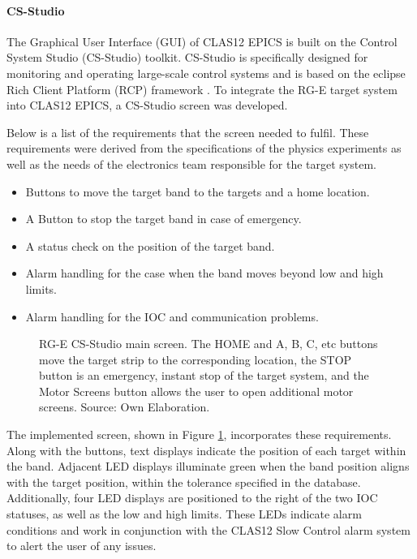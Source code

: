 \paragraph{CS-Studio}
\label{par::cs_studio}
    The Graphical User Interface (GUI) of CLAS12 EPICS is built on the Control System Studio (CS-Studio) toolkit.
    CS-Studio is specifically designed for monitoring and operating large-scale control systems and is based on the eclipse Rich Client Platform (RCP) framework \cite{kasemir2007}.
    To integrate the RG-E target system into CLAS12 EPICS, a CS-Studio screen was developed.

    Below is a list of the requirements that the screen needed to fulfil.
    These requirements were derived from the specifications of the physics experiments as well as the needs of the electronics team responsible for the target system.

    \begin{itemize}
        \item
            Buttons to move the target band to the targets and a home location.
        \item
            A Button to stop the target band in case of emergency.
        \item
            A status check on the position of the target band.
        \item
            Alarm handling for the case when the band moves beyond low and high limits.
        \item
            Alarm handling for the IOC and communication problems.
    \end{itemize}

    \begin{figure}[b!]
        \centering{}
        \caption[RG-E CS-Studio main screen]{RG-E CS-Studio main screen. The HOME and A, B, C, etc buttons move the target strip to the corresponding location, the STOP button is an emergency, instant stop of the target system, and the Motor Screens button allows the user to open additional motor screens.
        Source: Own Elaboration.}
        \label{fig::rge_motorx}
    \end{figure}

The implemented screen, shown in Figure \ref{fig::rge_motorx}, incorporates these requirements.
    Along with the buttons, text displays indicate the position of each target within the band.
    Adjacent LED displays illuminate green when the band position aligns with the target position, within the tolerance specified in the database.
    Additionally, four LED displays are positioned to the right of the two IOC statuses, as well as the low and high limits.
    These LEDs indicate alarm conditions and work in conjunction with the CLAS12 Slow Control alarm system to alert the user of any issues.

